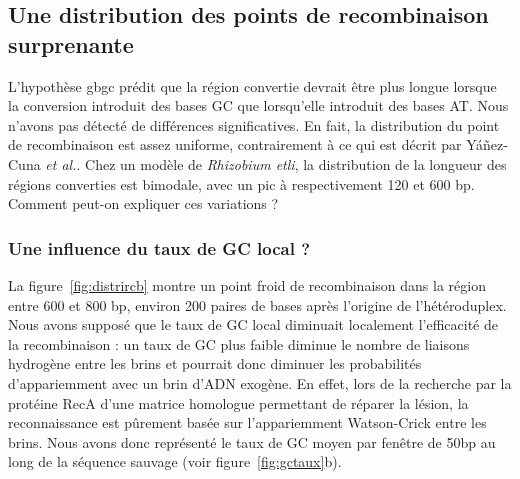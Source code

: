 \subsection{Une distribution des points de recombinaison surprenante}

L'hypothèse \ac{gbgc} prédit que la région convertie devrait être plus longue
lorsque la conversion introduit des bases GC que lorsqu'elle introduit des bases
AT. Nous n'avons pas détecté de différences significatives. En fait, la
distribution du point de recombinaison est assez uniforme, contrairement
à ce qui est décrit par Yáñez-Cuna \emph{et al.}\cite{yanez-cuna_biased_2015}.
Chez un modèle de \emph{Rhizobium etli}, la distribution de la longueur des
régions converties est bimodale, avec un pic à respectivement 120 et 600 bp.
Comment peut-on expliquer ces variations ?

\subsubsection{Une influence du taux de GC local ?}

La figure~\ref{fig:distrircb} montre un point froid de recombinaison dans la
région entre 600 et 800 bp, environ 200 paires de bases après l'origine de
l'hétéroduplex. Nous avons supposé que le taux de GC local diminuait localement
l'efficacité de la recombinaison : un taux de GC plus faible diminue le nombre
de liaisons hydrogène entre les brins et pourrait donc diminuer les probabilités
d'appariemment avec un brin d'ADN exogène. En effet, lors de la recherche par la
protéine RecA d'une matrice homologue permettant de réparer la lésion, la
reconnaissance est pûrement basée sur l'appariemment Watson-Crick entre les
brins\cite{lee_base_2015}. Nous avons donc représenté le taux de GC moyen par
fenêtre de 50bp au long de la séquence sauvage (voir figure~\ref{fig:gctaux}b).

